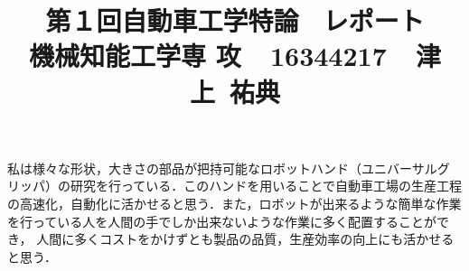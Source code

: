 \documentclass[a4paper,12pt]{jarticle}
\begin{document}
%
\title{\vspace{-30mm}  第１回自動車工学特論 \ レポート \\ 機械知能工学専
攻~~16344217~~津上~祐典}
\date{}
%
\maketitle
%
\vspace{-20mm}
%
私は様々な形状，大きさの部品が把持可能なロボットハンド（ユニバーサルグ
リッパ）の研究を行っている．このハンドを用いることで自動車工場の生産工程
の高速化，自動化に活かせると思う．また，ロボットが出来るような簡単な作業
を行っている人を人間の手でしか出来ないような作業に多く配置することができ，
人間に多くコストをかけずとも製品の品質，生産効率の向上にも活かせると思う．
\end{document}
